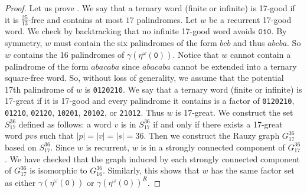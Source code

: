\documentclass[10pt,a4paper]{amsart}
\begin{document}
\begin{proof}
Let us prove .
We say that a ternary word (finite or infinite) is 17-good if it is $\tfrac{25}{13}$-free and contains at most $17$ palindromes.
Let $w$ be a recurrent 17-good word.
We check by backtracking that no infinite 17-good word avoids $\texttt{010}$.
By symmetry, $w$ must contain the six palindromes of the form $bcb$ and thus $abcba$.
So $w$ contains the 16 palindromes of $\gamma(\eta^\omega(\texttt{0}))$.
Notice that $w$ cannot contain a palindrome of the form $abacaba$ since $abacaba$
cannot be extended into a ternary square-free word.
So, without loss of generality, we assume that the potential 17th palindrome of $w$ is \texttt{0120210}.
We say that a ternary word (finite or infinite) is 17-great if it is 17-good and every palindrome it contains is a factor of \texttt{0120210}, \texttt{01210}, \texttt{02120}, \texttt{10201}, \texttt{20102}, or \texttt{21012}.
Thus $w$ is 17-great. We construct the set $S_{17}^{36}$ defined as follows:
a word $v$ is in $S_{17}^{36}$ if and only if there exists a 17-great word $pvs$ such that $|p|=|v|=|s|=36$.
Then we construct the Rauzy graph $G_{17}^{36}$ based on $S_{17}^{36}$.
Since $w$ is recurrent, $w$ is in a strongly connected component of $G_{17}^{36}$.
We have checked that the graph induced by each strongly connected component of $G_{17}^{36}$
is isomorphic to $G_{16}^{36}$.
Similarly, this shows that $w$ has the same factor set as either
$\gamma(\eta^\omega(\texttt{0}))$ or $\gamma(\eta^\omega(\texttt{0}))^R$.
\end{proof}
\end{document}
